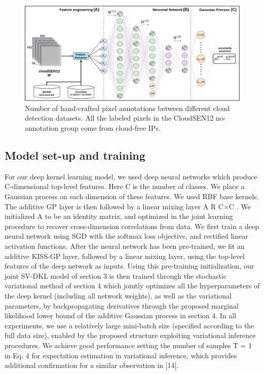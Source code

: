 \documentclass[a4paper, nobind]{templates/cdethesis}
\begin{document}
\begin{figure}[!h]
    \centering
    \includegraphics[width=1\linewidth]{figures/chapter02/figure02.png}
    \caption{Number of hand-crafted pixel annotations between different cloud detection datasets. All the labeled pixels in the CloudSEN12 no-annotation group come from cloud-free IPs.}
    \label{fig:figure02}
\end{figure}

\hypertarget{model-set-up-and-training}{%
\subsection{Model set-up and training}\label{model-set-up-and-training}}

For our deep kernel learning model, we used deep neural networks which produce
C-dimensional top-level features. Here C is the number of classes. We place a Gaussian process on each dimension of these features. We used RBF base kernels. The additive GP layer is then followed by a linear mixing layer A R C×C . We initialized A to be an identity matrix, and optimized in the joint learning procedure to recover cross-dimension correlations from data.
We first train a deep neural network using SGD with the softmax loss objective, and rectified linear activation functions. After the neural network has been pre-trained, we fit an additive KISS-GP layer, followed by a linear mixing layer, using the top-level features of the deep network as inputs. Using this pre-training initialization, our joint SV-DKL model of section 3 is then trained through the stochastic variational method of section 4 which jointly optimizes all the hyperparameters of the deep kernel (including all network weights), as well as the variational parameters, by backpropagating derivatives through the proposed marginal likelihood lower bound of the additive Gaussian process in section 4. In all experiments, we use a relatively large mini-batch size (specified according to the full data size), enabled by the proposed structure exploiting variational inference procedures. We achieve good performance setting the number of samples T = 1 in Eq. 4 for expectation estimation in variational inference, which provides additional confirmation for a similar observation in {[}14{]}.
\end{document}
